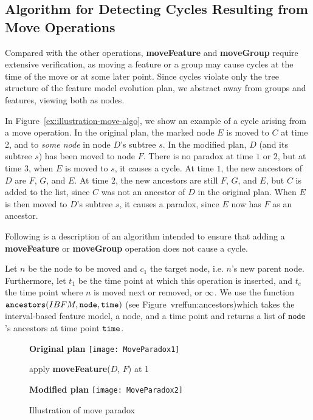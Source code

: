 \subsection{Algorithm for Detecting Cycles Resulting from \textbf{Move} Operations}
\label{sub:move-algorithm}

Compared with the other operations, \textbf{moveFeature} and \textbf{moveGroup} require extensive verification, as moving a feature or a group may cause cycles at the time of the move or at some later point. Since cycles violate only the tree structure of the feature model evolution plan, we abstract away from groups and features, viewing both as nodes.  

In Figure~\vref{ex:illustration-move-algo}, we show an example of a cycle arising from a move operation. In the original plan, the marked node $E$ is moved to $C$ at time 2, and to \emph{some node} in node $D$'s subtree $s$. In the modified plan, $D$ (and its subtree $s$) has been moved to node $F$. There is no paradox at time $1$ or $2$, but at time 3, when $E$ is moved to $s$, it causes a cycle. At time $1$, the new ancestors of $D$ are $F$, $G$, and $E$. At time $2$, the new ancestors are still $F$, $G$, and $E$, but $C$ is added to the list, since $C$ was not an ancestor of $D$ in the original plan. When $E$ is then moved to $D$'s subtree $s$, it causes a paradox, since $E$ now has $F$ as an ancestor.

Following is a description of an algorithm intended to ensure that adding a \textbf{moveFeature} or \textbf{moveGroup} operation does not cause a cycle.

Let $n$ be the node to be moved and $c_1$ the target node, i.e. $n$'s new parent node. Furthermore, let $t_1$ be the time point at which this operation is inserted, and $t_e$ the time point where $n$ is moved next or removed, or $\infty$. We use the function $\texttt{ancestors}(IBFM, \texttt{node}, \texttt{time})$ (see Figure~vref{fun:ancestors})which takes the interval-based feature model, a node, and a time point and returns a list of $\texttt{node}$'s ancestors at time point $\texttt{time}$. 


\begin{figure}
  \centering
  \textbf{Original plan}
  \texttt{[image: MoveParadox1]}
  \bigskip

  apply \textbf{moveFeature}($D$, $F$) at 1
  \bigskip 
  
  \textbf{Modified plan}
  \texttt{[image: MoveParadox2]}
  \caption{Illustration of move paradox}
  \label{ex:illustration-move-algo}
\end{figure}


